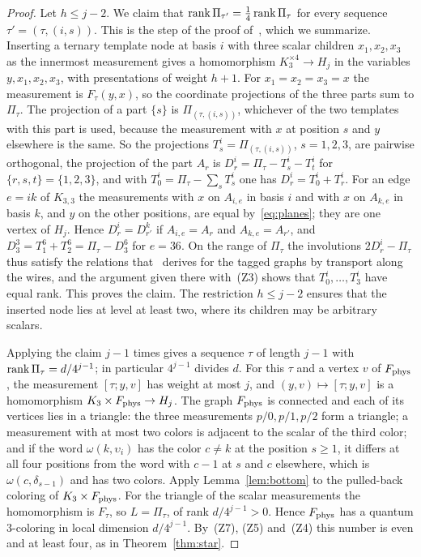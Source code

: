 \begin{proof}
Let $h\le j-2$. We claim that $\operatorname{rank} \Pi_{\tau'}=\frac14\operatorname{rank} \Pi_\tau$ for every sequence $\tau'=(\tau,(i,s))$. This is the step of the proof of~\cite[Theorem~4.1]{Z}, which we summarize. Inserting a ternary template node at basis $i$ with three scalar children $x_1,x_2,x_3$ as the innermost measurement gives a homomorphism $K_3^{\times4}\to H_j$ in the variables $y,x_1,x_2,x_3$, with presentations of weight $h+1$. For $x_1=x_2=x_3=x$ the measurement is $F_\tau(y,x)$, so the coordinate projections of the three parts sum to $\Pi_\tau$. The projection of a part $\{s\}$ is $\Pi_{(\tau,(i,s))}$, whichever of the two templates with this part is used, because the measurement with $x$ at position $s$ and $y$ elsewhere is the same. So the projections $T^i_s=\Pi_{(\tau,(i,s))}$, $s=1,2,3$, are pairwise orthogonal, the projection of the part $A_r$ is $D^i_r=\Pi_\tau-T^i_s-T^i_t$ for $\{r,s,t\}=\{1,2,3\}$, and with $T^i_0=\Pi_\tau-\sum_sT^i_s$ one has $D^i_r=T^i_0+T^i_r$. For an edge $e=ik$ of $K_{3,3}$ the measurements with $x$ on $A_{i,e}$ in basis $i$ and with $x$ on $A_{k,e}$ in basis $k$, and $y$ on the other positions, are equal by~\eqref{eq:planes}; they are one vertex of $H_j$. Hence $D^i_r=D^k_{r'}$ if $A_{i,e}=A_r$ and $A_{k,e}=A_{r'}$, and $D^3_3=T^6_1+T^6_2=\Pi_\tau-D^6_3$ for $e=36$. On the range of $\Pi_\tau$ the involutions $2D^i_r-\Pi_\tau$ thus satisfy the relations that~\cite{Z} derives for the tagged graphs by transport along the wires, and the argument given there with~(Z3) shows that $T^i_0,\ldots,T^i_3$ have equal rank. This proves the claim. The restriction $h\le j-2$ ensures that the inserted node lies at level at least two, where its children may be arbitrary scalars.

Applying the claim $j-1$ times gives a sequence $\tau$ of length $j-1$ with $\operatorname{rank} \Pi_\tau=d/4^{j-1}$; in particular $4^{j-1}$ divides $d$. For this $\tau$ and a vertex $v$ of $F_{\rm phys}$, the measurement $[\tau;y,v]$ has weight at most $j$, and $(y,v)\mapsto[\tau;y,v]$ is a homomorphism $K_3\times F_{\rm phys}\to H_j$. The graph $F_{\rm phys}$ is connected and each of its vertices lies in a triangle: the three measurements $p/0,p/1,p/2$ form a triangle; a measurement with at most two colors is adjacent to the scalar of the third color; and if the word $\omega(k,\upsilon_i)$ has the color $c\ne k$ at the position $s\ge1$, it differs at all four positions from the word with $c-1$ at $s$ and $c$ elsewhere, which is $\omega(c,\delta_{s-1})$ and has two colors. Apply Lemma~\ref{lem:bottom} to the pulled-back coloring of $K_3\times F_{\rm phys}$. For the triangle of the scalar measurements the homomorphism is $F_\tau$, so $L=\Pi_\tau$, of rank $d/4^{j-1}>0$. Hence $F_{\rm phys}$ has a quantum $3$-coloring in local dimension $d/4^{j-1}$. By~(Z7), (Z5) and~(Z4) this number is even and at least four, as in Theorem~\ref{thm:star}.


\end{proof}
